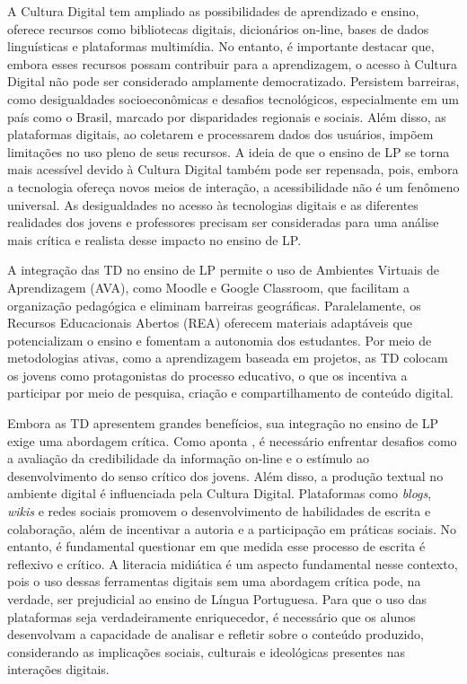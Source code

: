 \documentclass[portuguese]{textolivre}
\begin{document}
A Cultura Digital tem ampliado as possibilidades de aprendizado e ensino, oferece recursos como bibliotecas digitais, dicionários on-line, bases de dados linguísticas e plataformas multimídia. No entanto, é importante destacar que, embora esses recursos possam contribuir para a aprendizagem, o acesso à Cultura Digital não pode ser considerado amplamente democratizado. Persistem barreiras, como desigualdades socioeconômicas e desafios tecnológicos, especialmente em um país como o Brasil, marcado por disparidades regionais e sociais. Além disso, as plataformas digitais, ao coletarem e processarem dados dos usuários, impõem limitações no uso pleno de seus recursos. A ideia de que o ensino de LP se torna mais acessível devido à Cultura Digital também pode ser repensada, pois, embora a tecnologia ofereça novos meios de interação, a acessibilidade não é um fenômeno universal. As desigualdades no acesso às tecnologias digitais e as diferentes realidades dos jovens e professores precisam ser consideradas para uma análise mais crítica e realista desse impacto no ensino de LP.

A integração das TD no ensino de LP permite o uso de Ambientes Virtuais de Aprendizagem (AVA), como Moodle e Google Classroom, que facilitam a organização pedagógica e eliminam barreiras geográficas. Paralelamente, os Recursos Educacionais Abertos (REA) oferecem materiais adaptáveis que potencializam o ensino e fomentam a autonomia dos estudantes. Por meio de metodologias ativas, como a aprendizagem baseada em projetos, as TD colocam os jovens como protagonistas do processo educativo, o que os incentiva a participar por meio de pesquisa, criação e compartilhamento de conteúdo digital.

Embora as TD apresentem grandes benefícios, sua integração no ensino de LP exige uma abordagem crítica. Como aponta \textcite{coscarelli2016}, é necessário enfrentar desafios como a avaliação da credibilidade da informação on-line e o estímulo ao desenvolvimento do senso crítico dos jovens. Além disso, a produção textual no ambiente digital é influenciada pela Cultura Digital. Plataformas como \textit{blogs}, \textit{wikis} e redes sociais promovem o desenvolvimento de habilidades de escrita e colaboração, além de incentivar a autoria e a participação em práticas sociais. No entanto, é fundamental questionar em que medida esse processo de escrita é reflexivo e crítico. A literacia midiática é um aspecto fundamental nesse contexto, pois o uso dessas ferramentas digitais sem uma abordagem crítica pode, na verdade, ser prejudicial ao ensino de Língua Portuguesa. Para que o uso das plataformas seja verdadeiramente enriquecedor, é necessário que os alunos desenvolvam a capacidade de analisar e refletir sobre o conteúdo produzido, considerando as implicações sociais, culturais e ideológicas presentes nas interações digitais.
\end{document}
